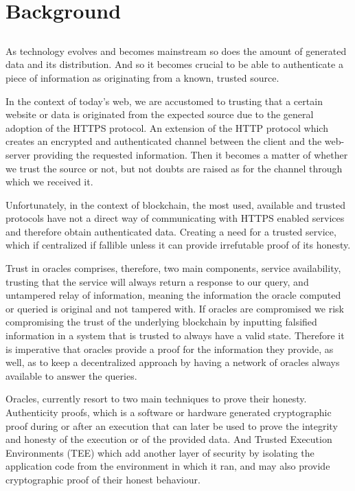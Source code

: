 \chapter{Background}\label{chap:chap3}

\section*{}
As technology evolves and becomes mainstream so does the amount of generated data and its distribution. And so it becomes crucial to be able to authenticate a piece of information as originating from a known, trusted source. 

In the context of today's web, we are accustomed to trusting that a certain website or data is originated from the expected source due to the general adoption of the HTTPS protocol. An extension of the HTTP protocol which creates an encrypted and authenticated channel between the client and the web-server providing the requested information. Then it becomes a matter of whether we trust the source or not, but not doubts are raised as for the channel through which we received it.

Unfortunately, in the context of blockchain, the most used, available and trusted protocols have not a direct way of communicating with HTTPS enabled services and therefore obtain authenticated data. Creating a need for a trusted service, which if centralized if fallible unless it can provide irrefutable proof of its honesty. 

Trust in oracles comprises, therefore, two main components, service availability, trusting that the service will always return a response to our query, and untampered relay of information, meaning the information the oracle computed or queried is original and not tampered with. If oracles are compromised we risk compromising the trust of the underlying blockchain by inputting falsified information in a system that is trusted to always have a valid state. Therefore it is imperative that oracles provide a proof for the information they provide, as well, as to keep a decentralized approach by having a network of oracles always available to answer the queries.

Oracles, currently resort to two main techniques to prove their honesty. Authenticity proofs, which is a software or hardware generated cryptographic proof during or after an execution that can later be used to prove the integrity and honesty of the execution or of the provided data. And Trusted Execution Environments (TEE) which add another layer of security by isolating the application code from the environment in which it ran, and may also provide cryptographic proof of their honest behaviour.

